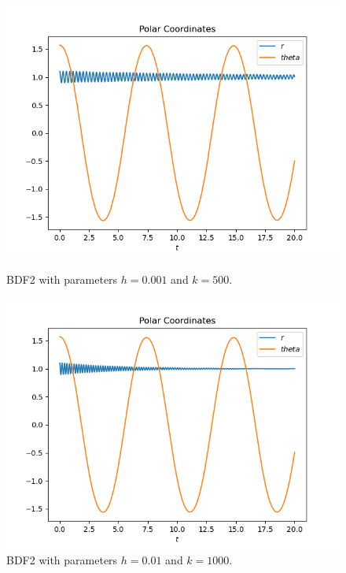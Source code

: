 \documentclass{report}
\begin{document}
\begin{figure}[h]
\centering
\begin{minipage}[b]{0.45\textwidth}
\centering
\includegraphics[width=\textwidth]{../Plots/BDF2/bdf2_h=0.01_k=500_c}
\caption{BDF2 with parameters $h=0.001$ and $k=500$.}
\label{exp_euler_k=50_h=0.001_c}
\end{minipage}
\hfill
\begin{minipage}[b]{0.45\textwidth}
\centering
\includegraphics[width=\textwidth]{../Plots/BDF2/bdf2_h=0.01_k=1000_c}
\caption{BDF2 with parameters $h=0.01$ and $k=1000$.}
\label{bdf2_h=00.1_k=1000_c}
\end{minipage}
\end{figure}
\end{document}
